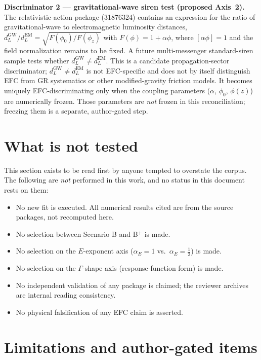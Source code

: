 \documentclass[11pt,a4paper]{article}
\begin{document}
\textbf{Discriminator 2 --- gravitational-wave siren test (proposed Axis~2).} The relativistic-action package (31876324) contains an expression for the ratio of gravitational-wave to electromagnetic luminosity distances, $d_{L}^{\mathrm{GW}}/d_{L}^{\mathrm{EM}} = \sqrt{F(\phi_{0})/F(\phi_{z})}$ with $F(\phi) = 1 + \alpha\phi$, where $[\alpha\phi] = 1$ and the field normalization remains to be fixed. A future multi-messenger standard-siren sample tests whether $d_{L}^{\mathrm{GW}} \neq d_{L}^{\mathrm{EM}}$. This is a candidate propagation-sector discriminator; $d_{L}^{\mathrm{GW}} \neq d_{L}^{\mathrm{EM}}$ is not EFC-specific and does not by itself distinguish EFC from GR systematics or other modified-gravity friction models. It becomes uniquely EFC-discriminating only when the coupling parameters ($\alpha$, $\phi_{0}$, $\phi(z)$) are numerically frozen. Those parameters are \emph{not} frozen in this reconciliation; freezing them is a separate, author-gated step.

\section{What is not tested}

This section exists to be read first by anyone tempted to overstate the corpus. The following are \emph{not} performed in this work, and no status in this document rests on them:

\begin{itemize}
\item No new fit is executed. All numerical results cited are from the source packages, not recomputed here.
\item No selection between Scenario B and B$^{+}$ is made.
\item No selection on the $E$-exponent axis ($\alpha_{E} = 1$ vs.\ $\alpha_{E} = \tfrac{1}{2}$) is made.
\item No selection on the $\Gamma$-shape axis (response-function form) is made.
\item No independent validation of any package is claimed; the reviewer archives are internal reading consistency.
\item No physical falsification of any EFC claim is asserted.
\end{itemize}

\section{Limitations and author-gated items}
\end{document}
